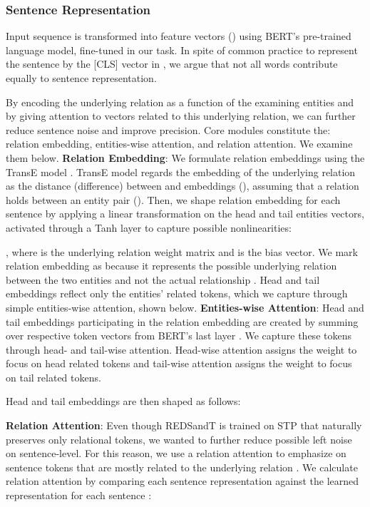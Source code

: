 \documentclass[11pt,a4paper]{article}
\begin{document}
\subsubsection{Sentence Representation}
Input sequence is transformed into feature vectors () using BERT's pre-trained language model, fine-tuned in our task. In spite of common practice to represent the sentence by the [CLS] vector in  \cite{Alt2019}, we argue that not all words contribute equally to sentence representation. 

By encoding the underlying relation as a function of the examining entities and by giving attention to vectors related to this underlying relation, we can further reduce sentence noise and improve precision. Core modules constitute the: relation embedding, entities-wise attention, and relation attention. We examine them below.
\smallskip
\newline
\textbf{Relation Embedding}:
We formulate relation embeddings using the TransE model \cite{Bordes2013}. TransE model regards the embedding of the underlying relation  as the distance (difference) between  and  embeddings (), assuming that a relation  holds between an entity pair (). Then, we shape relation embedding for each sentence  by applying a linear transformation on the head and tail entities vectors, activated through a Tanh layer to capture possible nonlinearities:

, where  is the underlying relation weight matrix and  is the bias vector.
We mark relation embedding as  because it represents the possible underlying relation between the two entities and not the actual relationship . Head  and tail  embeddings reflect only the entities' related tokens, which we capture through simple entities-wise attention, shown below.
\newline
\textbf{Entities-wise Attention}:
Head and tail embeddings participating in the relation embedding are created by summing over respective token vectors from BERT's last layer . We capture these tokens through head- and tail-wise attention. Head-wise attention assigns the weight  to focus on head related tokens and tail-wise attention assigns the weight  to focus on tail related tokens. 




Head  and tail  embeddings are then shaped as follows:

\noindent\begin{minipage}{.5\linewidth}

\end{minipage}\begin{minipage}{.5\linewidth}

\end{minipage}
\smallskip
\newline
\textbf{Relation Attention}:
Even though REDSandT is trained on STP that naturally preserves only relational tokens, we wanted to further reduce possible left noise on sentence-level. For this reason, we use a relation attention to emphasize on sentence tokens that are mostly related to the underlying relation . We calculate relation attention  by comparing each sentence representation against the learned representation  for each sentence :
\end{document}
